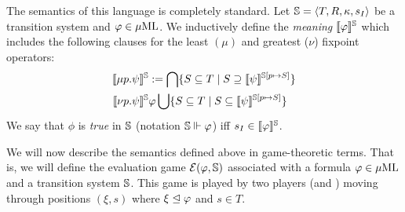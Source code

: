 The semantics of this language is completely standard. 
Let $\mathbb{S} = \langle{T,R,\kappa, s_I}\rangle$ be a transition system and $\varphi \in 
\mu\mathrm{ML}$. 
We inductively define the \emph{meaning} $\llbracket\varphi\rrbracket^{\mathbb{S}}$ which includes
the following clauses for the least $(\mu)$ and greatest ($\nu$) fixpoint 
operators:
%
\begin{align*}
  \llbracket\mu p.\psi\rrbracket^{\mathbb{S}}  & \mathrel{:=}   \bigcap \{S \subseteq T \mid S \supseteq \llbracket\psi\rrbracket^{\mathbb{S}[p\mapsto S]} \}  \\
  \llbracket\nu p.\psi\rrbracket^{\mathbb{S}}  & \varphi   \bigcup \{S \subseteq T \mid S \subseteq \llbracket\psi\rrbracket^{\mathbb{S}[p\mapsto S]} \}
\end{align*}
%
We say that $\phi$ is \emph{true} in $\mathbb{S}$ (notation $\mathbb{S} \Vdash \varphi$) iff $s_I \in \llbracket\varphi\rrbracket^{\mathbb{S}}$.%

We will now describe the semantics defined above in game-theoretic terms. 
That is, we will define the evaluation game $\mathcal{E}(\varphi,\mathbb{S})$ associated with
a formula $\varphi \in \mu\mathrm{ML}$ and a transition system $\mathbb{S}$. 
This game is played by two players (\eloise and \abelard) moving through 
positions $(\xi,s)$ where $\xi \trianglelefteq \varphi$ and $s \in T$.
%


